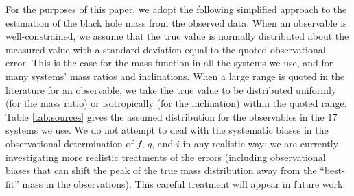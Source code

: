 \documentclass[preprint]{aastex}
\begin{document}
For the purposes of this paper, we adopt the following simplified
approach to the estimation of the black hole mass from the observed
data.  When an observable is well-constrained, we assume that the true
value is normally distributed about the measured value with a standard
deviation equal to the quoted observational error.  This is the case
for the mass function in all the systems we use, and for many systems'
mass ratios and inclinations.  When a large range is quoted in the
literature for an observable, we take the true value to be distributed
uniformly (for the mass ratio) or isotropically (for the inclination)
within the quoted range.  Table \ref{tab:sources} gives the assumed
distribution for the observables in the 17 systems we use.  We do not
attempt to deal with the systematic biases in the observational
determination of $f$, $q$, and $i$ in any realistic way; we are
currently investigating more realistic treatments of the errors
(including observational biases that can shift the peak of the true
mass distribution away from the ``best-fit'' mass in the
observations).  This careful treatment will appear in future work.
\end{document}
